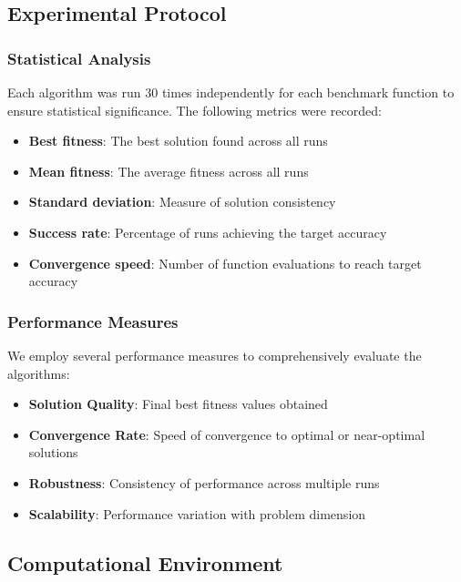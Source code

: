\subsection{Experimental Protocol}

\subsubsection{Statistical Analysis}

Each algorithm was run 30 times independently for each benchmark function to ensure statistical significance. The following metrics were recorded:

\begin{itemize}
    \item \textbf{Best fitness}: The best solution found across all runs
    \item \textbf{Mean fitness}: The average fitness across all runs
    \item \textbf{Standard deviation}: Measure of solution consistency
    \item \textbf{Success rate}: Percentage of runs achieving the target accuracy
    \item \textbf{Convergence speed}: Number of function evaluations to reach target accuracy
\end{itemize}

\subsubsection{Performance Measures}

We employ several performance measures to comprehensively evaluate the algorithms:

\begin{itemize}
    \item \textbf{Solution Quality}: Final best fitness values obtained
    \item \textbf{Convergence Rate}: Speed of convergence to optimal or near-optimal solutions
    \item \textbf{Robustness}: Consistency of performance across multiple runs
    \item \textbf{Scalability}: Performance variation with problem dimension
\end{itemize}

\subsection{Computational Environment}

